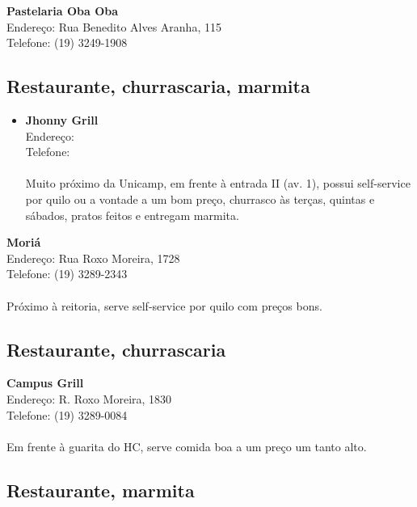 \begin{itemsize}
\item \textbf{Pastelaria Oba Oba}
  \\Endereço: Rua Benedito Alves Aranha, 115
  \\Telefone: (19) 3249-1908
  \\
\end{itemsize}

\subsection{Restaurante, churrascaria, marmita}

\begin{itemize}
\item \textbf{Jhonny Grill}
  \\Endereço:
  \\Telefone:
  \\
  \\Muito próximo da Unicamp, em frente à entrada II (av. 1), possui
  self-service por quilo ou a vontade a um bom preço, churrasco às terças,
  quintas e sábados, pratos feitos e entregam marmita.
\end{itemize}

\begin{itemsize}
\item \textbf{Moriá}
  \\Endereço: Rua Roxo Moreira, 1728
  \\Telefone: (19) 3289-2343
  \\
  \\Próximo à reitoria, serve self-service por quilo com preços bons.
\end{itemsize}

\subsection{Restaurante, churrascaria}

\begin{itemsize}
\item \textbf{Campus Grill}
  \\Endereço: R. Roxo Moreira, 1830
  \\Telefone: (19) 3289-0084
  \\
  \\Em frente à guarita do HC, serve comida boa a um preço um tanto alto.
\end{itemsize}

\subsection{Restaurante, marmita}

